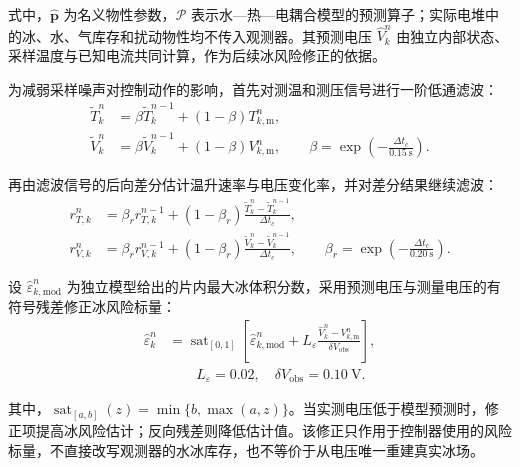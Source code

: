 式中，$\widehat{\boldsymbol p}$ 为名义物性参数，$\mathcal P$ 表示水—热—电耦合模型的预测算子；实际电堆中的冰、水、气库存和扰动物性均不传入观测器。其预测电压 $\widehat V_k^n$ 由独立内部状态、采样温度与已知电流共同计算，作为后续冰风险修正的依据。

为减弱采样噪声对控制动作的影响，首先对测温和测压信号进行一阶低通滤波：
\begin{equation}
\begin{aligned}
\widetilde T_k^n&=\beta\widetilde T_k^{n-1}+(1-\beta)T_{k,\mathrm m}^n,\\
\widetilde V_k^n&=\beta\widetilde V_k^{n-1}+(1-\beta)V_{k,\mathrm m}^n,
\qquad \beta=\exp\!\left(-\frac{\Delta t_c}{0.15\ \mathrm s}\right).
\end{aligned}
\tag{7-12}\label{eq:q4:signal_filter}
\end{equation}

再由滤波信号的后向差分估计温升速率与电压变化率，并对差分结果继续滤波：
\begin{equation}
\begin{aligned}
r_{T,k}^n&=\beta_r r_{T,k}^{n-1}+(1-\beta_r)
\frac{\widetilde T_k^n-\widetilde T_k^{n-1}}{\Delta t_c},\\
r_{V,k}^n&=\beta_r r_{V,k}^{n-1}+(1-\beta_r)
\frac{\widetilde V_k^n-\widetilde V_k^{n-1}}{\Delta t_c},\qquad
\beta_r=\exp\!\left(-\frac{\Delta t_c}{0.20\ \mathrm s}\right).
\end{aligned}
\tag{7-13}\label{eq:q4:rate_filter}
\end{equation}

设 $\widehat\varepsilon_{k,\mathrm{mod}}^n$ 为独立模型给出的片内最大冰体积分数，采用预测电压与测量电压的有符号残差修正冰风险标量：
\begin{equation}
\begin{aligned}
\widehat\varepsilon_k^n
&=\operatorname{sat}_{[0,1]}\!\left[
\widehat\varepsilon_{k,\mathrm{mod}}^n
+L_\varepsilon\frac{\widehat V_k^n-V_{k,\mathrm m}^n}{\delta V_{\mathrm{obs}}}\right],
\\
&\qquad L_\varepsilon=0.02,\quad\delta V_{\mathrm{obs}}=0.10\ \mathrm V.
\end{aligned}
\tag{7-14}\label{eq:q4:ice_estimator}
\end{equation}

其中，$\operatorname{sat}_{[a,b]}(z)=\min\{b,\max(a,z)\}$。当实测电压低于模型预测时，修正项提高冰风险估计；反向残差则降低估计值。该修正只作用于控制器使用的风险标量，不直接改写观测器的水冰库存，也不等价于从电压唯一重建真实冰场。

